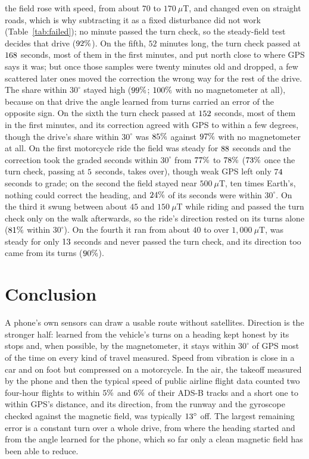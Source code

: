 \documentclass[11pt]{article}
\newcommand{\dg}{^\circ}
\begin{document}
the field rose with speed, from about $70$ to $170~\mu$T, and changed even on straight roads, which is why
subtracting it as a fixed disturbance did not work (Table~\ref{tab:failed}); no minute passed the turn
check, so the steady-field test decides that drive ($92\%$). On the fifth, $52$ minutes long, the turn check
passed at $168$ seconds, most of them in the first minutes, and put north close to where GPS says it was; but
once those samples were twenty minutes old and dropped, a few scattered later ones moved the correction
the wrong way for the rest of the drive. The share within $30\dg$ stayed high ($99\%$; $100\%$ with no
magnetometer at all), because on that drive the angle learned from turns carried an error of the
opposite sign. On the sixth the turn check passed at $152$ seconds, most of them in the first minutes, and
its correction agreed with GPS to within a few degrees, though the drive's share within $30\dg$ was $85\%$ against $97\%$
with no magnetometer at all. On the first motorcycle ride the field was
steady for $88$ seconds and the correction took the graded seconds within $30\dg$ from $77\%$ to $78\%$
($73\%$ once the turn check, passing at $5$ seconds, takes over), though weak GPS left only $74$ seconds
to grade; on the second the field stayed near $500~\mu$T, ten times Earth's, nothing could correct the
heading, and $24\%$ of its seconds were within $30\dg$. On the third it swung between about $45$ and $150~\mu$T while
riding and passed the turn check only on the walk afterwards, so the ride's direction rested on its
turns alone ($81\%$ within $30\dg$). On the fourth it ran from about $40$ to over $1{,}000~\mu$T, was steady for only
$13$ seconds and never passed the turn check, and its direction too came from its turns ($90\%$).

\section{Conclusion}

A phone's own sensors can draw a usable route without satellites. Direction is the stronger half:
learned from the vehicle's turns on a heading kept honest by its stops and, when possible, by the
magnetometer, it stays within $30\dg$ of GPS most of the time on every kind of travel measured. Speed
from vibration is close in a car and on foot but compressed on a motorcycle. In the air, the takeoff
measured by the phone and then the typical speed of public airline flight data counted two four-hour flights
to within $\the\numexpr100-\nAirLongShare\relax\%$ and $\the\numexpr100-\nAirRetShare\relax\%$ of their ADS-B tracks and a short one to within GPS's
distance, and its direction, from the runway and the gyroscope checked against the magnetic field, was
typically $\nAirDirAll\dg$ off. The largest remaining error is a
constant turn over a whole drive, from where the heading started and from the angle learned for the
phone, which so far only a clean magnetic field has been able to reduce.
\end{document}
